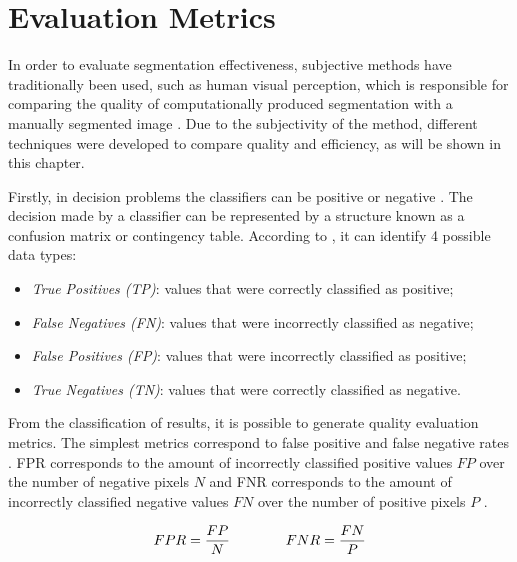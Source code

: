 \section{Evaluation Metrics}
\label{cap3_metricas_avaliacao}

In order to evaluate segmentation effectiveness, subjective methods have traditionally been used, such as human visual perception, which is responsible for comparing the quality of computationally produced segmentation with a manually segmented image \cite{Zhang08imagesegmentation}. Due to the subjectivity of the method, different techniques were developed to compare quality and efficiency, as will be shown in this chapter. 

Firstly, in decision problems the classifiers can be positive or negative \cite{DavisGoadrich:2006}. 
The decision made by a classifier can be represented by a structure known as a confusion matrix or contingency table.
According to \cite{DavisGoadrich:2006}, it can identify 4 possible data types:

\vspace{-0.2cm}
\begin{itemize}
 \item \textit{True Positives (TP)}: values that were correctly classified as positive;
 \item \textit{False Negatives (FN)}: values that were incorrectly classified as negative;
 \item \textit{False Positives (FP)}: values that were incorrectly classified as positive;
 \item \textit{True Negatives (TN)}: values that were correctly classified as negative.
\end{itemize}

From the classification of results, it is possible to generate quality evaluation metrics.
The simplest metrics correspond to false positive and false negative rates \cite{Fawcett:2006}.
\ac{FPR} corresponds to the amount of incorrectly classified positive values $FP$ over the number of negative pixels $N$ and 
\ac{FNR} corresponds to the amount of incorrectly classified negative values $FN$ over the number of positive pixels $P$ \cite{Fawcett:2006}.

\begin{equation}
  \centering
  \label{equ:cap3_false_rate}
  \begin{aligned}
    FPR = \frac{FP}{N} \qquad\qquad
    FNR = \frac{FN}{P} 
  \end{aligned}
\end{equation}


